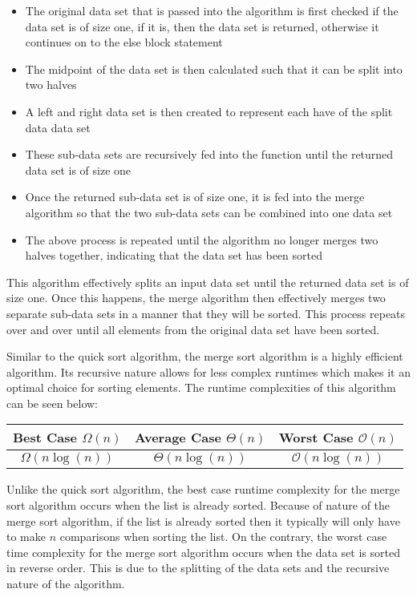 \begin{highlight}
\begin{itemize}
    \item The original data set that is passed into the algorithm is first checked if the data set is of size one, if it is, then the data set is returned, otherwise it continues on to the else block statement
    \item The midpoint of the data set is then calculated such that it can be split into two halves
    \item A left and right data set is then created to represent each have of the split data data set
    \item These sub-data sets are recursively fed into the function until the returned data set is of size one
    \item Once the returned sub-data set is of size one, it is fed into the merge algorithm so that the two sub-data sets can be combined into one data set
    \item The above process is repeated until the algorithm no longer merges two halves together, indicating that the data set has been sorted
\end{itemize}

\noindent This algorithm effectively splits an input data set until the returned data set is of size one. Once this happens, the merge algorithm then effectively merges two separate sub-data sets in a manner that they will be sorted. This process repeats over and over until all elements from the original data set have been sorted.

Similar to the quick sort algorithm, the merge sort algorithm is a highly efficient algorithm. Its recursive nature allows for less complex runtimes which makes it an optimal choice for sorting elements. The runtime complexities of this algorithm can be seen below:

\begin{center}
    \begin{tabular}{|c|c|c|}
        \hline \textbf{Best Case $\Omega(n)$} & \textbf{Average Case $\Theta(n)$} & \textbf{Worst Case $\mathcal{O}(n)$} \\ \hline
        $\Omega(n\log{(n)})$ & $\Theta(n\log{(n)})$ & $\mathcal{O}(n\log{(n)})$ \\ \hline
    \end{tabular}
\end{center}

\noindent Unlike the quick sort algorithm, the best case runtime complexity for the merge sort algorithm occurs when the list is already sorted. Because of nature of the merge sort algorithm, if the list is already sorted then it typically will only have to make $n$ comparisons when sorting the list. On the contrary, the worst case time complexity
for the merge sort algorithm occurs when the data set is sorted in reverse order. This is due to the splitting of the data sets and the recursive nature of the algorithm. 


\end{highlight}
